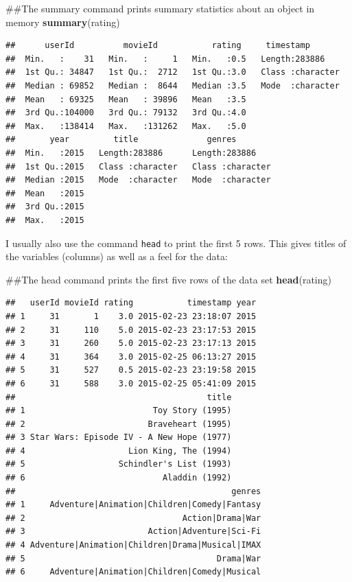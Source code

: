 \documentclass[]{book}
\newenvironment{Shaded}{\begin{snugshade}}{\end{snugshade}}
\newcommand{\KeywordTok}[1]{\textcolor[rgb]{0.13,0.29,0.53}{\textbf{{#1}}}}
\newcommand{\NormalTok}[1]{{#1}}
\begin{document}
\begin{Shaded}
\begin{Highlighting}[]
\NormalTok{##The summary command prints summary statistics about an object in memory}
\KeywordTok{summary}\NormalTok{(rating)}
\end{Highlighting}
\end{Shaded}

\begin{verbatim}
##      userId          movieId           rating     timestamp        
##  Min.   :    31   Min.   :     1   Min.   :0.5   Length:283886     
##  1st Qu.: 34847   1st Qu.:  2712   1st Qu.:3.0   Class :character  
##  Median : 69852   Median :  8644   Median :3.5   Mode  :character  
##  Mean   : 69325   Mean   : 39896   Mean   :3.5                     
##  3rd Qu.:104000   3rd Qu.: 79132   3rd Qu.:4.0                     
##  Max.   :138414   Max.   :131262   Max.   :5.0                     
##       year         title              genres         
##  Min.   :2015   Length:283886      Length:283886     
##  1st Qu.:2015   Class :character   Class :character  
##  Median :2015   Mode  :character   Mode  :character  
##  Mean   :2015                                        
##  3rd Qu.:2015                                        
##  Max.   :2015
\end{verbatim}

I usually also use the command \texttt{head} to print the first 5 rows.
This gives titles of the variables (columns) as well as a feel for the
data:

\begin{Shaded}
\begin{Highlighting}[]
\NormalTok{##The head command prints the first five rows of the data set}
\KeywordTok{head}\NormalTok{(rating)}
\end{Highlighting}
\end{Shaded}

\begin{verbatim}
##   userId movieId rating           timestamp year
## 1     31       1    3.0 2015-02-23 23:18:07 2015
## 2     31     110    5.0 2015-02-23 23:17:53 2015
## 3     31     260    5.0 2015-02-23 23:17:13 2015
## 4     31     364    3.0 2015-02-25 06:13:27 2015
## 5     31     527    0.5 2015-02-23 23:19:58 2015
## 6     31     588    3.0 2015-02-25 05:41:09 2015
##                                       title
## 1                          Toy Story (1995)
## 2                         Braveheart (1995)
## 3 Star Wars: Episode IV - A New Hope (1977)
## 4                     Lion King, The (1994)
## 5                   Schindler's List (1993)
## 6                            Aladdin (1992)
##                                            genres
## 1     Adventure|Animation|Children|Comedy|Fantasy
## 2                                Action|Drama|War
## 3                         Action|Adventure|Sci-Fi
## 4 Adventure|Animation|Children|Drama|Musical|IMAX
## 5                                       Drama|War
## 6     Adventure|Animation|Children|Comedy|Musical
\end{verbatim}
\end{document}
